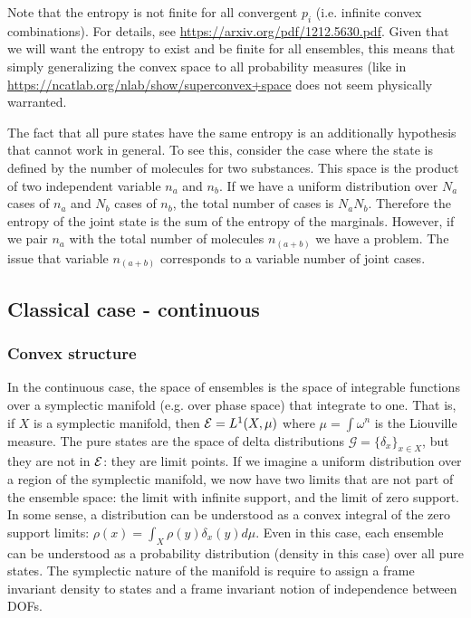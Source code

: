 Note that the entropy is not finite for all convergent $p_i$ (i.e. infinite convex combinations). For details, see \url{https://arxiv.org/pdf/1212.5630.pdf}. Given that we will want the entropy to exist and be finite for all ensembles, this means that simply generalizing the convex space to all probability measures (like in \url{https://ncatlab.org/nlab/show/superconvex+space} does not seem physically warranted.

The fact that all pure states have the same entropy is an additionally hypothesis that cannot work in general. To see this, consider the case where the state is defined by the number of molecules for two substances. This space is the product of two independent variable $n_a$ and $n_b$. If we have a uniform distribution over $N_a$ cases of $n_a$ and $N_b$ cases of $n_b$, the total number of cases is $N_a N_b$. Therefore the entropy of the joint state is the sum of the entropy of the marginals. However, if we pair $n_a$ with the total number of molecules $n_{(a+b)}$ we have a problem. The issue that variable $n_{(a+b)}$ corresponds to a variable number of joint cases.

\subsection{Classical case - continuous}

\subsubsection{Convex structure}

In the continuous case, the space of ensembles is the space of integrable functions over a symplectic manifold (e.g.  over phase space) that integrate to one. That is, if $X$ is a symplectic manifold, then $\mathcal{E} = L^1(X, \mu)$ where $\mu=\int \omega^n$ is the Liouville measure. The pure states are the space of delta distributions $\mathcal{G} = \{\delta_x\}_{x \in X}$, but they are not in  $\mathcal{E}$: they are limit points. If we imagine a uniform distribution over a region of the symplectic manifold, we now have two limits that are not part of the ensemble space: the limit with infinite support, and the limit of zero support. In some sense, a distribution can be understood as a convex integral of the zero support limits: $\rho(x) = \int_X \rho(y) \delta_x(y) d\mu$. Even in this case, each ensemble can be understood as a probability distribution (density in this case) over all pure states. The symplectic nature of the manifold is require to assign a frame invariant density to states and a frame invariant notion of independence between DOFs.

